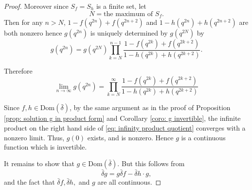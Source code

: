 \documentclass[10pt,a4paper]{amsart}
\def\Dom{{\mathrm {Dom}}}
\def\d{\bar{\delta}}
\def\db{\bar{\delta}}
\begin{document}
\begin{proof}
    

   Moreover since $S_f=S_h$ is a finite set, let 
   $$
   N= \text{the maximum of }S_f.
   $$
Then for any $n>N$, $1 - f(q^{2n}) + f(q^{2n+2})$ and $1 - h(q^{2n}) + h(q^{2n+2})$ are both nonzero hence $g(q^{2n})$ is uniquely determined by $g(q^{2N})$ by
\begin{equation}
    g(q^{2n}) = g(q^{2N})\prod_{k=N}^{n-1} \frac{1 - f(q^{2k}) + f(q^{2k+2})}{1 - h(q^{2k}) + h(q^{2k+2})} .
    \end{equation}

    Therefore
  \begin{equation}\label{eq: infinity product quotient}
    \lim_{n \to \infty} g(q^{2n}) 
  =\prod_{k = N }^{\infty}  \frac{1 - f(q^{2k}) + f(q^{2k + 2})}{1 - h(q^{2k}) + h(q^{2k + 2})}
    \end{equation}

   Since $f,h\in \Dom(\db)$, by the same argument as in the proof of Proposition \ref{prop: solution g in product form} and Corollary \ref{coro: g invertible}, the infinite product on the right hand side of \eqref{eq: infinity product quotient} converges with a nonzero limit. Thus, $g(0)$ exists, and is nonzero.
   Hence $g$ is a continuous function which is invertible.
    
    It remains to show that $g\in \Dom(\db)$. But this  follows from \[
    \d g = g \d f - \d h \cdot g,
    \]
    and the fact that $\d f, \d h,$ and $g$ are all continuous.
\end{proof}
\end{document}
